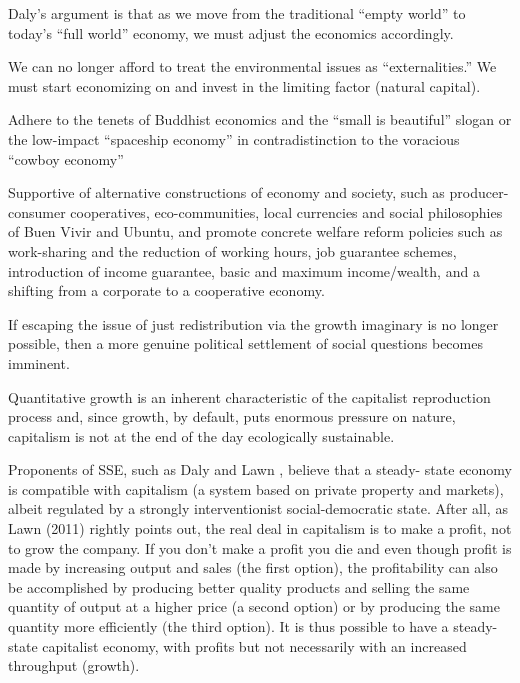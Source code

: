\documentclass[
]{book}
\begin{document}
Daly's argument is that as we move from the
traditional ``empty world'' to today's ``full world'' economy, we must adjust the economics accordingly.

We can no longer afford to treat the environmental issues as ``externalities.''
We must start economizing on and invest in the limiting factor (natural
capital).

Adhere to the tenets of Buddhist economics and the ``small is beautiful'' slogan
or the low-impact ``spaceship economy'' in contradistinction
to the voracious ``cowboy economy''

Supportive of alternative constructions of economy and society, such
as producer-consumer cooperatives, eco-communities, local currencies and social philosophies of Buen Vivir
and Ubuntu, and promote concrete welfare reform policies such as work-sharing and the reduction of working
hours, job guarantee schemes, introduction of income guarantee, basic and maximum income/wealth, and a shifting from a corporate to a cooperative economy.

If escaping the issue of just redistribution via the growth imaginary is no longer possible,
then a more genuine political settlement of social questions becomes imminent.

Quantitative growth is an inherent characteristic of the capitalist reproduction process
and, since growth, by default, puts enormous pressure on nature, capitalism is not at the end of the day ecologically sustainable.

Proponents of SSE, such as Daly and Lawn , believe that a steady-
state economy is compatible with capitalism (a system based on private property and markets), albeit regulated
by a strongly interventionist social-democratic state. After all, as Lawn (2011) rightly points out, the real deal
in capitalism is to make a profit, not to grow the company.
If you don't make a profit you die and even though
profit is made by increasing output and sales (the first option), the profitability can also be accomplished by
producing better quality products and selling the same quantity of output at a higher price (a second option) or
by producing the same quantity more efficiently (the third option). It is thus possible to have a steady-state
capitalist economy, with profits but not necessarily with an increased throughput (growth).
\end{document}
